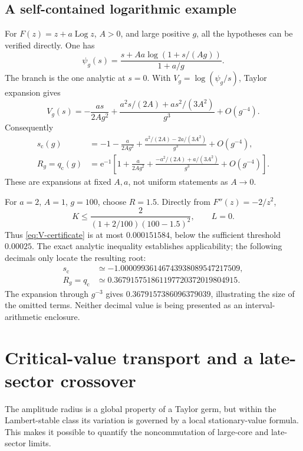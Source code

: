\documentclass[11pt,a4paper]{article}
\numberwithin{equation}{section}
\theoremstyle{definition}
\theoremstyle{remark}
\newcommand{\e}{\mathrm e}
\newcommand{\Log}{\operatorname{Log}}
\begin{document}
\subsection{A self-contained logarithmic example}
For $F(z)=z+a\Log z$, $A>0$, and large positive $g$, all the hypotheses can be verified directly. One has
\begin{equation}
 \psi_g(s)=\frac{s+Aa\log(1+s/(Ag))}{1+a/g}.
 \label{eq:logpsi}
\end{equation}
The branch is the one analytic at $s=0$. With $V_g=\log(\psi_g/s)$, Taylor expansion gives
\begin{equation}
 V_g(s)=-\frac{as}{2Ag^2}
  +\frac{a^2s/(2A)+as^2/(3A^2)}{g^3}+O(g^{-4}).
 \label{eq:logV}
\end{equation}
Consequently
\begin{align}
 s_{\mathrm c}(g)&=-1-\frac{a}{2Ag^2}
       +\frac{a^2/(2A)-2a/(3A^2)}{g^3}+O(g^{-4}),\\
 R_g=q_{\mathrm c}(g)&=\e^{-1}\left[
     1+\frac{a}{2Ag^2}
       +\frac{-a^2/(2A)+a/(3A^2)}{g^3}+O(g^{-4})\right].
 \label{eq:log-radius}
\end{align}
These are expansions at fixed $A,a$, not uniform statements as $A\to0$.

For $a=2$, $A=1$, $g=100$, choose $R=1.5$. Directly from $F''(z)=-2/z^2$,
\[
 K\leq\frac{2}{(1+2/100)(100-1.5)^2},\qquad L=0.
\]
Thus \eqref{eq:V-certificate} is at most
$0.000151584$, below the sufficient threshold $0.00025$. The exact analytic inequality establishes applicability; the following decimals only locate the resulting root:
\begin{align*}
 s_{\mathrm c}&\simeq-1.00009936146743938089547217509,\\
 R_g=q_{\mathrm c}&\simeq0.367915751861197720372019804915.
\end{align*}
The expansion through $g^{-3}$ gives $0.3679157386096379039$, illustrating the size of the omitted terms. Neither decimal value is being presented as an interval-arithmetic enclosure.

\section{Critical-value transport and a late-sector crossover}
\label{sec:parameters}
The amplitude radius is a global property of a Taylor germ, but within the Lambert-stable class its variation is governed by a local stationary-value formula. This makes it possible to quantify the noncommutation of large-core and late-sector limits.
\end{document}
